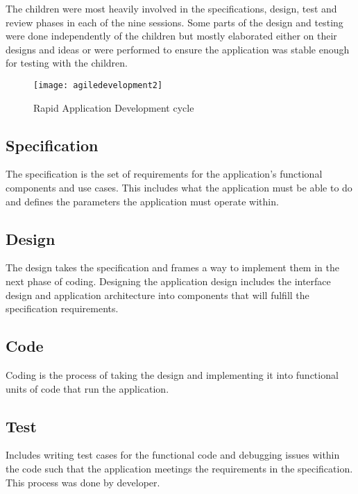 The children were most heavily involved in the specifications, design, test and review phases in each of the nine sessions. Some parts of the design and testing were done independently of the children but mostly elaborated either on their designs and ideas or were performed to ensure the application was stable enough for testing with the children.  

\begin{figure}
\centering
\texttt{[image: agiledevelopment2]}
\caption{Rapid Application Development cycle }
\label{fig:agiledesignprocess}
\end{figure}


\subsection{Specification}\label{sec:specificationphase}
The specification is the set of requirements for the application's functional components and use cases. This includes what the application must be able to do and defines the parameters the application must operate within. 

\subsection{Design}\label{sec:designphase}
 The design takes the specification and frames a way to implement them in the next phase of coding. Designing the application design includes the interface design and application architecture into components that will fulfill the specification requirements.  

\subsection{Code}\label{sec:codephase}
Coding is the process of taking the design and implementing it into functional units of code that run the application. 

\subsection{Test}\label{sec:testphase}

Includes writing test cases for the functional code and debugging issues within the code such that the application meetings the requirements in the specification. This process was done by developer.

